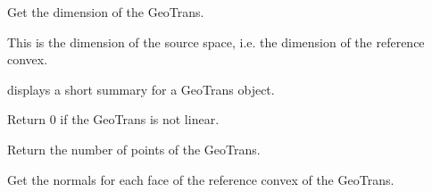 \documentclass[a4paper,11pt,english]{sphinxmanual}
\begin{document}
\begin{fulllineitems}

\begin{fulllineitems}
\label{\detokenize{python/cmdref_GeoTrans:getfem.GeoTrans.dim}}
Get the dimension of the GeoTrans.

This is the dimension of the source space, i.e. the dimension of
the reference convex.

\end{fulllineitems}


\begin{fulllineitems}
\label{\detokenize{python/cmdref_GeoTrans:getfem.GeoTrans.display}}
displays a short summary for a GeoTrans object.

\end{fulllineitems}


\begin{fulllineitems}
\label{\detokenize{python/cmdref_GeoTrans:getfem.GeoTrans.is_linear}}
Return 0 if the GeoTrans is not linear.

\end{fulllineitems}


\begin{fulllineitems}
\label{\detokenize{python/cmdref_GeoTrans:getfem.GeoTrans.nbpts}}
Return the number of points of the GeoTrans.

\end{fulllineitems}


\begin{fulllineitems}
\label{\detokenize{python/cmdref_GeoTrans:getfem.GeoTrans.normals}}
Get the normals for each face of the reference convex of the GeoTrans.


\end{fulllineitems}
\end{fulllineitems}
\end{document}
